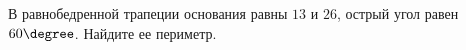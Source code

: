 \begin{ex}
	\begin{condition}
		В равнобедренной трапеции основания равны \( 13  \) и \( 26 \), острый угол равен \( 60\degree  \). Найдите ее периметр.
	\end{condition}
\end{ex}